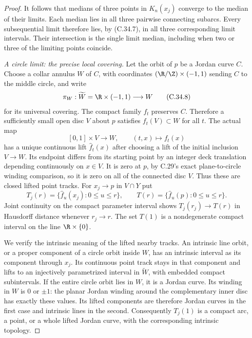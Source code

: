 \begin{proof}
It follows that medians of three points in $K_n(x_j)$
converge to the median of their limits. Each median
lies in all three pairwise connecting subarcs.
Every subsequential limit therefore lies, by
(C.34.7), in all three corresponding limit intervals.
Their intersection is the single limit median,
including when two or three of the limiting points
coincide.

\emph{A circle limit: the precise local covering.}
Let the orbit of $p$ be a Jordan curve $C$. Choose a
collar annulus $W$ of $C$, with coordinates
$(\R/\Z)\times(-1,1)$ sending $C$ to the middle circle,
and write
\[
 \pi_W:\widetilde W=\R\times(-1,1)\longrightarrow W
                                                        \tag{C.34.8}
\]
for its universal covering. The compact family
$f_t$ preserves $C$. Therefore a sufficiently small
open disc $V$ about $p$ satisfies
$f_t(V)\subset W$ for all $t$.
The actual map
\[
 [0,1]\times V\longrightarrow W,\qquad
                         (t,x)\longmapsto f_t(x)
                                                        \tag{C.34.9}
\]
has a unique continuous lift $\widehat f_t(x)$ after
choosing a lift of the initial inclusion $V\to W$.
Its endpoint differs from its starting point by
an integer deck translation depending continuously
on $x\in V$. It is zero at $p$, by C.29's exact
plane-to-circle winding comparison, so it is zero
on all of the connected disc $V$.
Thus these are closed lifted point tracks.
For $x_j\to p$ in $V\cap Y$ put
\[
 T_j(r)=\{\widehat f_u(x_j):0\leq u\leq r\},\qquad
 T(r)=\{\widehat f_u(p):0\leq u\leq r\}.
                                                        \tag{C.34.10}
\]
Joint continuity on the compact parameter interval
shows $T_j(r_j)\to T(r)$ in Hausdorff distance
whenever $r_j\to r$. The set $T(1)$ is a
nondegenerate compact interval on the line
$\R\times\{0\}$.

We verify the intrinsic meaning of the lifted
nearby tracks. An intrinsic line orbit, or a
proper component of a circle orbit inside $W$,
has an intrinsic interval as its component through
$x_j$. Its continuous point track stays in that
component and lifts to an injectively parametrized
interval in $\widetilde W$, with embedded compact
subintervals. If the entire circle orbit lies in
$W$, it is a Jordan curve. Its winding in $W$
is $0$ or $\pm1$: the planar Jordan winding
around the complementary inner disc has exactly
these values. Its lifted components are therefore
Jordan curves in the first case and intrinsic
lines in the second.
Consequently $T_j(1)$ is a compact arc, a point,
or a whole lifted Jordan curve, with the
corresponding intrinsic topology.


\end{proof}
